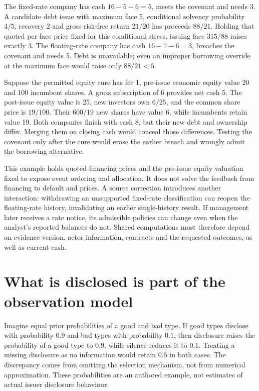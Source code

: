 \documentclass[11pt,a4paper]{article}
\begin{document}
The fixed-rate company has cash $16-5-6=5$, meets the covenant and needs 3.
A candidate debt issue with maximum face 5, conditional solvency probability
$4/5$, recovery 2 and gross risk-free return $21/20$ has proceeds $88/21$.
Holding that quoted per-face price fixed for this conditional stress, issuing
face $315/88$ raises exactly 3. The floating-rate company has cash
$16-7-6=3$, breaches the covenant and needs 5. Debt is unavailable; even an
improper borrowing override at the maximum face would raise only $88/21<5$.

Suppose the permitted equity cure has fee 1, pre-issue economic equity value
20 and 100 incumbent shares. A gross subscription of 6 provides net cash 5.
The post-issue equity value is 25, new investors own $6/25$, and the common
share price is $19/100$. Their $600/19$ new shares have value 6, while
incumbents retain value 19. Both companies finish with cash 8, but their new
debt and ownership differ. Merging them on closing cash would conceal those
differences. Testing the covenant only after the cure would erase the earlier
breach and wrongly admit the borrowing alternative.

This example holds quoted financing prices and the pre-issue equity valuation
fixed to expose event ordering and allocation. It does not solve the feedback
from financing to default and prices. A source correction introduces another
interaction: withdrawing an unsupported fixed-rate classification can reopen
the floating-rate history, invalidating an earlier single-history result.
If management later receives a rate notice, its admissible policies can change
even when the analyst's reported balances do not. Shared computations must
therefore depend on evidence version, actor information, contracts and the
requested outcomes, as well as current cash.

\section{What is disclosed is part of the observation model}
Imagine equal prior probabilities of a good and bad type. If good types
disclose with probability $0.9$ and bad types with probability $0.1$, then
disclosure raises the probability of a good type to $0.9$, while silence
reduces it to $0.1$. Treating a missing disclosure as no information would
retain $0.5$ in both cases. The discrepancy comes from omitting the selection
mechanism, not from numerical approximation. These probabilities are an
authored example, not estimates of actual issuer disclosure behaviour.
\end{document}
